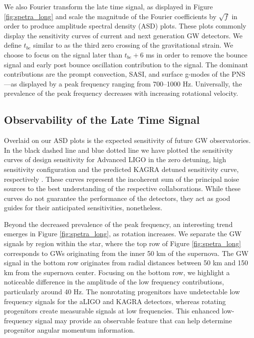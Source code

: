 \documentclass[twocolumn,times]{aastex62}  %
\begin{document}
We also Fourier transform the late time signal, as displayed in Figure \ref{fig:spetra_long} and scale the magnitude of the Fourier coefficients by $\sqrt{f}$ in order to produce amplitude spectral density (ASD) plots.  These plots commonly display the sensitivity curves of current and next generation GW detectors.  We define $t_{be}$ similar to \citet{richers:2017} as the third zero crossing of the gravitational strain.  We choose to focus on the signal later than $t_{be} + 6$ ms in order to remove the bounce signal and early post bounce oscillation contribution to the signal.  
The dominant contributions are the prompt convection, SASI, and surface g-modes of the PNS---as displayed by a peak frequency ranging from 700--1000 Hz.  Universally, the prevalence of the peak frequency decreases with increasing rotational velocity.

\subsection{Observability of the Late Time Signal}

Overlaid on our ASD plots is the expected sensitivity of future GW observatories.  
In the black dashed line and blue dotted line we have plotted the sensitivity curves of design sensitivity for Advanced LIGO in the zero detuning, high sensitivity configuration and the predicted KAGRA detuned sensitivity curve, respectively \citep{komari:2017,barsotti:2018}.
These curves represent the incoherent sum of the principal noise sources to the best understanding of the respective collaborations.  While these curves do not guarantee the performance of the detectors, they act as good guides for their anticipated sensitivities, nonetheless. 

Beyond the decreased prevalence of the peak frequency, an interesting trend emerges in Figure \ref{fig:spetra_long}, as rotation increases.  
We separate the GW signals by region within the star, where the top row of Figure \ref{fig:spetra_long} corresponds to GWs originating from the inner 50 km of the supernova.  The GW signal in the bottom row originates from radial distances between 50 km and 150 km from the supernova center.
Focusing on the bottom row, we highlight a noticeable difference in the amplitude of the low frequency contributions, particularly around 40 Hz.  The nonrotating progenitors have undetectable low frequency signals for the aLIGO and KAGRA detectors, whereas rotating progenitors create measurable signals at low frequencies. 
This enhanced low-frequency signal may provide an observable feature that can help determine progenitor angular momentum information.  
\end{document}
